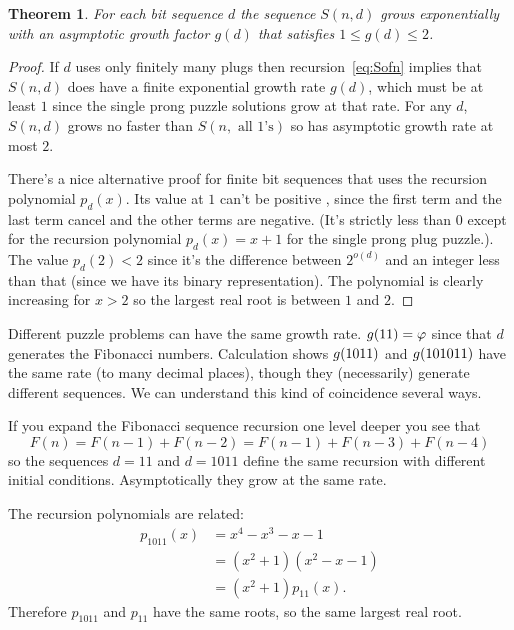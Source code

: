 \documentclass[10pt]{article}
\newtheorem{theorem}{Theorem}
\numberwithin{equation}{section}
\newcommand{\plug}[1]{%
\mbox{{\textbf\texttt #1}}
}
\begin{document}
\begin{theorem}\label{thm:shift}
For each bit sequence $d$ the  sequence $S(n,d)$ grows exponentially
with an asymptotic growth factor $g(d)$ that satisfies  $1 \le g(d) \le 2$. 
\end{theorem}
\begin{proof}
 If $d$  uses only finitely many plugs then  recursion~\ref{eq:Sofn}
implies that $S(n,d)$ does have a finite exponential growth rate
$g(d)$, which must be at least $1$ since the single prong puzzle
solutions grow at that rate. For any $d$, $S(n,d)$ grows no faster
than $S(n, \text{ all 1's})$ so has asymptotic growth rate at most $2$.

There's a nice alternative proof for finite bit sequences that uses
the recursion polynomial $p_d(x)$. Its value at $1$ can't be positive ,
since the first term and the last term cancel and the other terms are
negative. (It's strictly less than $0$ except for the recursion
polynomial $p_d(x) = x + 1$ for the single prong plug puzzle.). The
value $p_d(2) < 2$ since it's the difference between $2^{o(d)}$ and
an integer less than that (since we have its binary
representation). The polynomial is clearly increasing for $x > 2$ so
the largest real root is between $1$ and $2$.
\end{proof}

Different puzzle problems can have the same growth rate.
$g(\plug{11})= \varphi$ since that $d$ generates the Fibonacci
  numbers. Calculation shows $g(\plug{1011})$ and $g(\plug{101011})$
  have the same rate (to many decimal places), though they
  (necessarily) generate different sequences.
We can understand this kind of coincidence several ways.

If you expand the Fibonacci sequence recursion one level deeper you
see that 
\begin{equation*}
F(n)=F(n-1)+F(n-2) = F(n-1)+F(n-3)+F(n-4)
\end{equation*}
so the sequences $d=11$ and $d=1011$ define the same recursion
with different initial
conditions. Asymptotically they grow at the same rate.

The recursion polynomials are related:
\begin{align*}
  p_{1011}(x) &= x^4 - x^3 - x - 1 \\
  &= (x^2 + 1)(x^2 - x - 1) \\
  &= (x^2 + 1)p_{11}(x).
\end{align*}
Therefore $p_{1011}$ and $p_{11}$ have the same roots, so the same largest
  real root.
\end{document}
